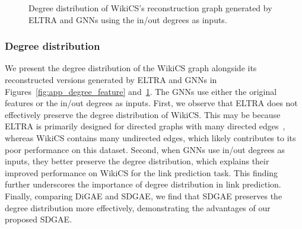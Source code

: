 \begin{figure}[t]
    \centering
   \hspace{-3mm}
   \hspace{-7mm}
   \hspace{-7mm}
   \hspace{-7mm}
   \hspace{-7mm}
   \vspace{-3mm}
   \caption{Degree distribution of WikiCS's reconstruction graph generated by ELTRA and GNNs using the in/out degrees as inputs.}
    \label{fig:app_degree_degree}
\end{figure}


\subsubsection{Degree distribution}\label{app_degree}
We present the degree distribution of the WikiCS graph alongside its reconstructed versions generated by ELTRA and GNNs in Figures~\ref{fig:app_degree_feature} and~\ref{fig:app_degree_degree}. The GNNs use either the original features or the in/out degrees as inputs. First, we observe that ELTRA does not effectively preserve the degree distribution of WikiCS. This may be because ELTRA is primarily designed for directed graphs with many directed edges~\cite{eltra}, whereas WikiCS contains many undirected edges, which likely contributes to its poor performance on this dataset. Second, when GNNs use in/out degrees as inputs, they better preserve the degree distribution, which explains their improved performance on WikiCS for the link prediction task. This finding further underscores the importance of degree distribution in link prediction. Finally, comparing DiGAE and SDGAE, we find that SDGAE preserves the degree distribution more effectively, demonstrating the advantages of our proposed SDGAE.

